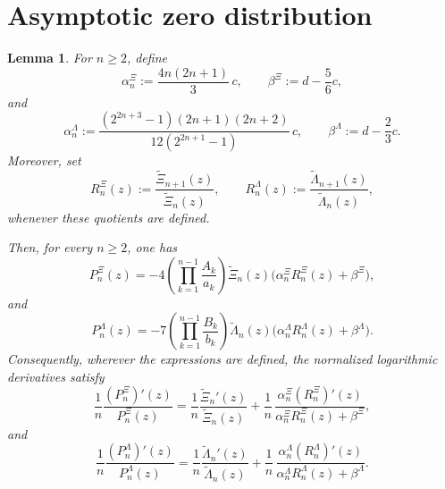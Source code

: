 \documentclass[11pt,twoside]{article}
\newtheorem{lemma}[theorem]{Lemma}
\numberwithin{equation}{section}
\begin{document}
\section{Asymptotic zero distribution}

\begin{lemma}\label{lem:log-derivative-decomposition}
For \(n\ge 2\), define
\[
\alpha_n^\Xi:=\frac{4n(2n+1)}{3}\,c,
\qquad
\beta^\Xi:=d-\frac56c,
\]
and
\[
\alpha_n^\Lambda:=
\frac{(2^{2n+3}-1)(2n+1)(2n+2)}{12(2^{2n+1}-1)}\,c,
\qquad
\beta^\Lambda:=d-\frac23c.
\]
Moreover, set
\[
R_n^\Xi(z):=\frac{\widetilde{\Xi}_{n+1}(z)}{\widetilde{\Xi}_n(z)},
\qquad
R_n^\Lambda(z):=\frac{\widetilde{\Lambda}_{n+1}(z)}{\widetilde{\Lambda}_n(z)},
\]
whenever these quotients are defined.

Then, for every \(n\ge 2\), one has
\[
P_n^\Xi(z)
=
-4\left(\prod_{k=1}^{n-1}\frac{A_k}{a_k}\right)
\widetilde{\Xi}_n(z)\bigl(\alpha_n^\Xi R_n^\Xi(z)+\beta^\Xi\bigr),
\]
and
\[
P_n^\Lambda(z)
=
-7\left(\prod_{k=1}^{n-1}\frac{B_k}{b_k}\right)
\widetilde{\Lambda}_n(z)\bigl(\alpha_n^\Lambda R_n^\Lambda(z)+\beta^\Lambda\bigr).
\]
Consequently, wherever the expressions are defined, the normalized logarithmic derivatives satisfy
\[
\frac1n\frac{(P_n^\Xi)'(z)}{P_n^\Xi(z)}
=
\frac1n\frac{\widetilde{\Xi}_n'(z)}{\widetilde{\Xi}_n(z)}
+
\frac1n\,
\frac{\alpha_n^\Xi (R_n^\Xi)'(z)}
{\alpha_n^\Xi R_n^\Xi(z)+\beta^\Xi},
\]
and
\[
\frac1n\frac{(P_n^\Lambda)'(z)}{P_n^\Lambda(z)}
=
\frac1n\frac{\widetilde{\Lambda}_n'(z)}{\widetilde{\Lambda}_n(z)}
+
\frac1n\,
\frac{\alpha_n^\Lambda (R_n^\Lambda)'(z)}
{\alpha_n^\Lambda R_n^\Lambda(z)+\beta^\Lambda}.
\]
\end{lemma}
\end{document}
